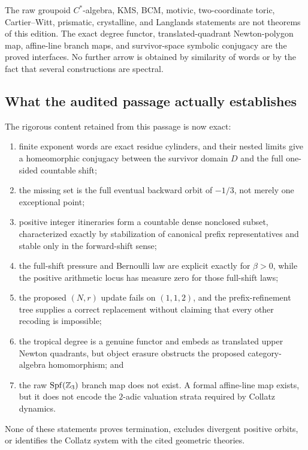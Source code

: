 \begin{nonclaim}
\label{nonclaim:symbolic-late-interface-boundary}
The raw groupoid $C^*$-algebra, KMS, BCM, motivic, two-coordinate toric,
Cartier--Witt, prismatic, crystalline, and Langlands statements are not
theorems of this edition.  The exact degree functor, translated-quadrant
Newton-polygon map, affine-line branch maps, and survivor-space symbolic conjugacy are the
proved interfaces.  No further arrow is obtained by similarity of words or
by the fact that several constructions are spectral.
\end{nonclaim}

\subsection{What the audited passage actually establishes}

The rigorous content retained from this passage is now exact:
\begin{enumerate}[label=\textup{(\arabic*)}]
\item finite exponent words are exact residue cylinders, and their nested
  limits give a homeomorphic conjugacy between the survivor domain $D$ and
  the full one-sided countable shift;
\item the missing set is the full eventual backward orbit of $-1/3$, not
  merely one exceptional point;
\item positive integer itineraries form a countable dense nonclosed subset,
  characterized exactly by stabilization of canonical prefix
  representatives and stable only in the forward-shift sense;
\item the full-shift pressure and Bernoulli law are explicit exactly for
  $\beta>0$, while the positive arithmetic locus has measure zero for those
  full-shift laws;
\item the proposed $(N,r)$ update fails on $(1,1,2)$, and the prefix-refinement
  tree supplies a correct replacement without claiming that every other
  recoding is impossible;
\item the tropical degree is a genuine functor and embeds as translated
  upper Newton quadrants, but object erasure obstructs the proposed category-algebra
  homomorphism; and
\item the raw $\operatorname{Spf}(\mathbb{Z}_3)$ branch map does not exist.  A formal
  affine-line map exists, but it does not encode the $2$-adic valuation
  strata required by Collatz dynamics.
\end{enumerate}
None of these statements proves termination, excludes divergent positive
orbits, or identifies the Collatz system with the cited geometric theories.
